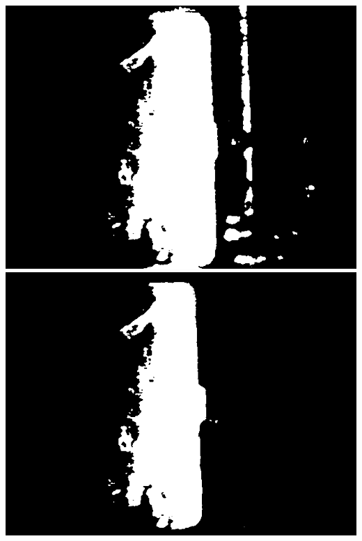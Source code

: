 \documentclass[12pt]{article}
\begin{document}
\includegraphics{images/volume_image_processing/binary_laser_image.png}
\includegraphics{images/volume_image_processing/union_laser_led_binaries.png}
\end{document}
